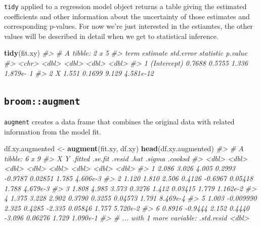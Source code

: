 \documentclass[]{book}
\newenvironment{Shaded}{\begin{snugshade}}{\end{snugshade}}
\newcommand{\CommentTok}[1]{\textcolor[rgb]{0.56,0.35,0.01}{\textit{#1}}}
\newcommand{\KeywordTok}[1]{\textcolor[rgb]{0.13,0.29,0.53}{\textbf{#1}}}
\newcommand{\NormalTok}[1]{#1}
\newcommand{\StringTok}[1]{\textcolor[rgb]{0.31,0.60,0.02}{#1}}
\theoremstyle{definition}
\theoremstyle{definition}
\theoremstyle{definition}
\theoremstyle{remark}
\begin{document}
\texttt{tidy} applied to a regression model object returns a table
giving the estimated coefficients and other information about the
uncertainty of those estimates and corresponding p-values. For now we're
just interested in the estiamtes, the other values will be described in
detail when we get to statistical inference.

\begin{Shaded}
\begin{Highlighting}[]
\KeywordTok{tidy}\NormalTok{(fit.xy)}
\CommentTok{#> # A tibble: 2 x 5}
\CommentTok{#>   term        estimate std.error statistic   p.value}
\CommentTok{#>   <chr>          <dbl>     <dbl>     <dbl>     <dbl>}
\CommentTok{#> 1 (Intercept)   0.7688    0.5755     1.336 1.879e- 1}
\CommentTok{#> 2 X             1.551     0.1699     9.129 4.581e-12}
\end{Highlighting}
\end{Shaded}

\hypertarget{broomaugment}{%
\subsection{\texorpdfstring{\texttt{broom::augment}}{broom::augment}}\label{broomaugment}}

\texttt{augment} creates a data frame that combines the original data
with related information from the model fit.

\begin{Shaded}
\begin{Highlighting}[]
\NormalTok{df.xy.augmented <-}\StringTok{ }\KeywordTok{augment}\NormalTok{(fit.xy, df.xy)}
\KeywordTok{head}\NormalTok{(df.xy.augmented)}
\CommentTok{#> # A tibble: 6 x 9}
\CommentTok{#>        X         Y .fitted .se.fit  .resid    .hat .sigma  .cooksd}
\CommentTok{#>    <dbl>     <dbl>   <dbl>   <dbl>   <dbl>   <dbl>  <dbl>    <dbl>}
\CommentTok{#> 1 2.086   3.026      4.005  0.2993 -0.9787 0.02851  1.785 4.606e-3}
\CommentTok{#> 2 1.120   1.810      2.506  0.4126 -0.6967 0.05418  1.788 4.679e-3}
\CommentTok{#> 3 1.808   4.985      3.573  0.3276  1.412  0.03415  1.779 1.162e-2}
\CommentTok{#> 4 1.375   3.228      2.902  0.3790  0.3255 0.04573  1.791 8.469e-4}
\CommentTok{#> 5 1.003  -0.009990   2.325  0.4285 -2.335  0.05846  1.757 5.720e-2}
\CommentTok{#> 6 0.8916 -0.9444     2.152  0.4440 -3.096  0.06276  1.729 1.090e-1}
\CommentTok{#> # ... with 1 more variable: .std.resid <dbl>}
\end{Highlighting}
\end{Shaded}
\end{document}
